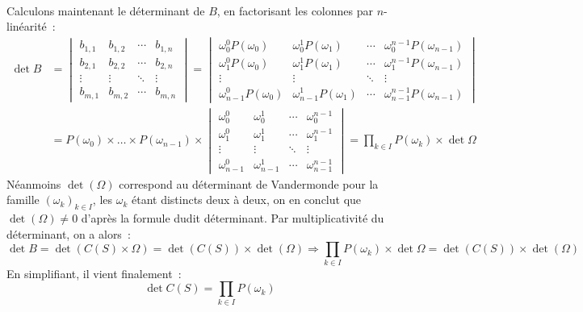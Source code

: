 \documentclass{article}
\begin{document}
  \paragraph{} Calculons maintenant le déterminant de $B$, en factorisant les colonnes par $n$-linéarité~:
  \begin{align*}
    \det B &=
    \begin{vmatrix}
      b_{1,1} & b_{1,2} & \cdots & b_{1,n} \\
      b_{2,1} & b_{2,2} & \cdots & b_{2,n} \\
      \vdots  & \vdots  & \ddots & \vdots  \\
      b_{m,1} & b_{m,2} & \cdots & b_{m,n}
    \end{vmatrix} =
    \begin{vmatrix}
      \omega_0^0 P(\omega_0) & \omega_0^1 P(\omega_1)& \cdots & \omega_0^{n-1}P(\omega_{n-1}) \\
      \omega_1^0 P(\omega_0)& \omega_1^1 P(\omega_1)& \cdots & \omega_1^{n-1} P(\omega_{n-1}) \\
      \vdots  & \vdots  & \ddots & \vdots  \\
      \omega_{n-1}^0 P(\omega_0)& \omega_{n-1}^1 P(\omega_1)& \cdots & \omega_{n-1}^{n-1} P(\omega_{n-1})
    \end{vmatrix} \\ &= P(\omega_0) \times \dots \times P(\omega_{n-1}) \times
    \begin{vmatrix}
      \omega_0^0 & \omega_0^1 & \cdots & \omega_0^{n-1} \\
      \omega_1^0 & \omega_1^1 & \cdots & \omega_1^{n-1} \\
      \vdots  & \vdots  & \ddots & \vdots  \\
      \omega_{n-1}^0 & \omega_{n-1}^1 & \cdots & \omega_{n-1}^{n-1}
    \end{vmatrix} = \prod_{k\in I} P(\omega_k) \times \det \Omega
  \end{align*}
  Néanmoins $\det(\Omega)$ correspond au déterminant de Vandermonde pour la famille $(\omega_k)_{k\in I}$, les $\omega_k$ étant distincts deux à deux, on en conclut que $\det(\Omega) \neq 0$ d'après la formule dudit déterminant. Par multiplicativité du déterminant, on a alors~:
  \[
    \det B = \det(C(S)\times \Omega) = \det(C(S)) \times \det(\Omega) \Longrightarrow \prod_{k\in I} P(\omega_k) \times \det \Omega =  \det(C(S)) \times \det(\Omega)
  \]
  En simplifiant, il vient finalement~:
  \[
    \det C(S) = \prod_{k\in I} P(\omega_k)
  \]
\end{document}
